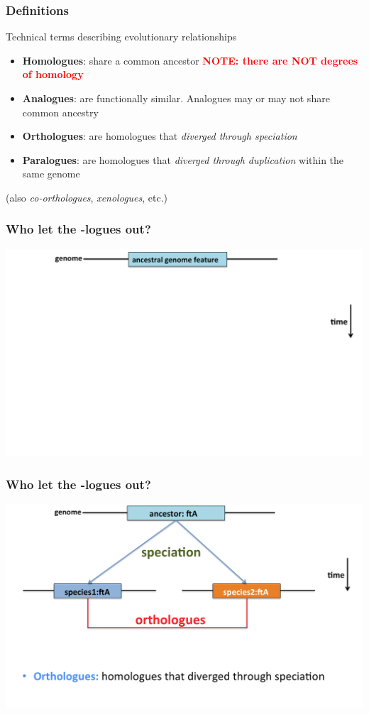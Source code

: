 %
\begin{frame}
  \frametitle{Definitions
  }
  Technical terms describing evolutionary relationships
  \begin{itemize}
    \item \textbf{\textcolor{hutton_blue}{Homologues}}: share a common ancestor \textcolor{red}{\textbf{NOTE: there are NOT degrees of homology}}
    \item \textbf{\textcolor{hutton_blue}{Analogues}}: are functionally similar. Analogues may or may not share common ancestry
    \item \textbf{\textcolor{hutton_green}{Orthologues}}: are homologues that \textit{diverged through speciation}
    \item \textbf{\textcolor{hutton_purple}{Paralogues}}: are homologues that \textit{diverged through duplication} within the same genome
  \end{itemize}
  (also \textit{co-orthologues}, \textit{xenologues}, etc.)
\end{frame}

% 
\begin{frame}
  \frametitle{Who let the -logues out?}
  \begin{center}
    \includegraphics[width=1\textwidth]{images/logues1}  
  \end{center}  
\end{frame}

% 
\begin{frame}
  \frametitle{Who let the -logues out?}
  \begin{center}
    \includegraphics[width=1\textwidth]{images/logues2}  
  \end{center}  
\end{frame}

